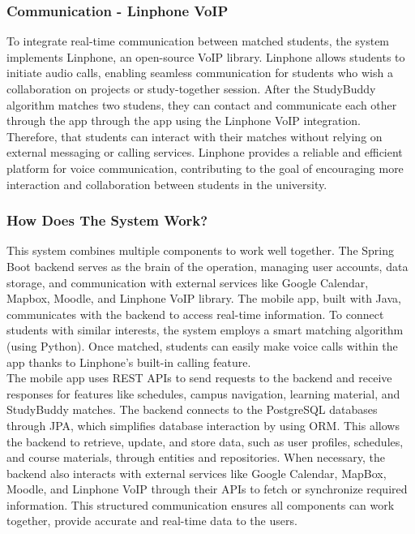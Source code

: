 \documentclass[12pt]{article}
\begin{document}
\subsubsection{Communication - Linphone VoIP}
To integrate real-time communication between matched students, the system implements Linphone, an open-source VoIP library.
Linphone allows students to initiate audio calls, enabling seamless communication for students who wish a collaboration on projects or study-together session.
After the StudyBuddy algorithm matches two studens, they can contact and communicate each other through the app through the app using the Linphone VoIP integration.
Therefore, that students can interact with their matches without relying on external messaging or calling services.
Linphone provides a reliable and efficient platform for voice communication, contributing to the goal of encouraging more interaction and collaboration between students in the university.

\subsubsection{How Does The System Work?}
This system combines multiple components to work well together.
The Spring Boot backend serves as the brain of the operation, managing user accounts, data storage, and communication with external services like Google Calendar, Mapbox, Moodle, and Linphone VoIP library.
The mobile app, built with Java, communicates with the backend to access real-time information. To connect students with similar interests, the system employs a smart matching algorithm (using Python). 
Once matched, students can easily make voice calls within the app thanks to Linphone's built-in calling feature. \\

The mobile app uses REST APIs to send requests to the backend and receive responses for features like schedules, campus navigation, learning material, and StudyBuddy matches. 
The backend connects to the PostgreSQL databases through JPA, which simplifies database interaction by using ORM.
This allows the backend to retrieve, update, and store data, such as user profiles, schedules, and course materials, through entities and repositories.
When necessary, the backend also interacts with external services like Google Calendar, MapBox, Moodle, and Linphone VoIP through their APIs to fetch or synchronize required information.
This structured communication ensures all components can work together, provide accurate and real-time data to the users.\\
\end{document}
